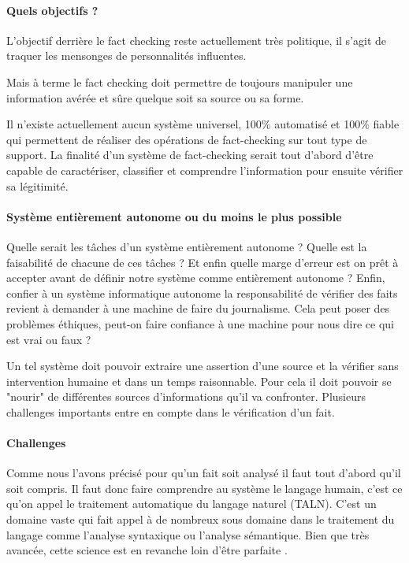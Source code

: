 \paragraph{Quels objectifs ?}

L'objectif derrière le fact checking reste actuellement très politique, il s'agit de traquer les mensonges de personnalités influentes.

Mais à terme le fact checking doit permettre de toujours manipuler une information avérée et sûre quelque soit sa source ou sa forme.

Il n'existe actuellement aucun système universel, 100\% automatisé et 100\% fiable qui permettent de réaliser des opérations de fact-checking sur tout type de support. La finalité d'un système de fact-checking serait tout d'abord d'être capable de caractériser, classifier et comprendre l'information pour ensuite vérifier sa légitimité. 

\paragraph{Système entièrement autonome ou du moins le plus possible}

Quelle serait les tâches d'un système entièrement autonome ? Quelle est la faisabilité de chacune de ces tâches ? Et enfin quelle marge d'erreur est on prêt à accepter avant de définir notre système comme entièrement autonome ? Enfin, confier à un système informatique autonome la responsabilité de vérifier des faits revient à demander à une machine de faire du journalisme. Cela peut poser des problèmes éthiques, peut-on faire confiance à une machine pour nous dire ce qui est vrai ou faux ?

Un tel système doit pouvoir extraire une assertion d'une source et la vérifier sans intervention humaine et dans un temps raisonnable. Pour cela il doit pouvoir se "nourir" de différentes sources d'informations qu'il va confronter. Plusieurs challenges importants entre en compte dans le vérification d'un fait.

\paragraph{Challenges}

Comme nous l'avons précisé pour qu'un fait soit analysé il faut tout d'abord qu'il soit compris. Il faut donc faire comprendre au système le langage humain, c'est ce qu'on appel le traitement automatique du langage naturel (TALN). C'est un domaine vaste qui fait appel à de nombreux sous domaine dans le traitement du langage comme l'analyse syntaxique ou l'analyse sémantique. Bien que très avancée, cette science est en revanche loin d'être parfaite \cite{nlp_not_perfect}.


